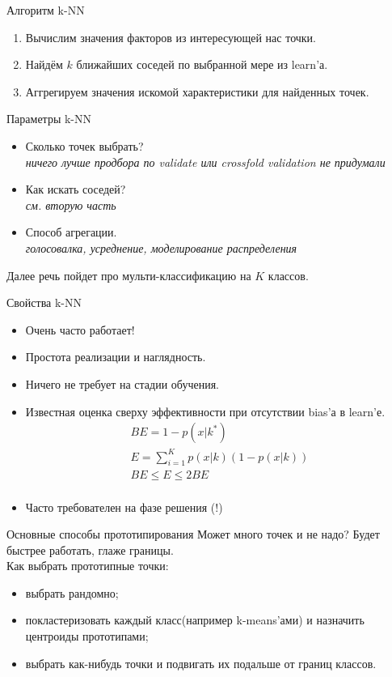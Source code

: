 \documentclass[14pt, fleqn, xcolor={dvipsnames, table}]{beamer}
\begin{document}
\begin{frame}{Алгоритм k-NN}
  \begin{enumerate}
    \item Вычислим значения факторов из интересующей нас точки.
    \item Найдём $k$ ближайших соседей по выбранной мере из learn'а.
    \item Аггрегируем значения искомой характеристики для найденных точек.
  \end{enumerate}
\end{frame}

\begin{frame}{Параметры k-NN}
  \begin{itemize}
    \item Сколько точек выбрать? \\
    \emph{ничего лучше продбора по validate или crossfold validation не придумали}
    \item Как искать соседей? \\
    \emph{см. вторую часть}
    \item Способ агрегации. \\
    \emph{голосовалка, усреднение, моделирование распределения}
  \end{itemize}
  Далее речь пойдет про мульти-классификацию на $K$ классов.
\end{frame}


\begin{frame}{Свойства k-NN}
  \begin{itemize}
    \item Очень часто работает! 
    \item Простота реализации и наглядность.
    \item Ничего не требует на стадии обучения.
    \item Известная оценка сверху эффективности при отсутствии bias'а в learn'е. \\
    $$
      \begin{array}{l}
      BE = 1 - p(x|k^*) \\
      E = \sum_{i=1}^Kp(x|k)(1-p(x|k)) \\
      BE \le E \le 2BE \\
      \end{array}
    $$
    \item Часто требователен на фазе решения (!)
  \end{itemize}
\end{frame}


\begin{frame}{Основные способы прототипирования}
  Может много точек и не надо? Будет быстрее работать, глаже границы. \\
  Как выбрать прототипные точки:
  \begin{itemize}
    \item выбрать рандомно;
    \item покластеризовать каждый класс(например k-means'ами) и назначить центроиды прототипами;
    \item выбрать как-нибудь точки и подвигать их подальше от границ классов.
  \end{itemize}
\end{frame}
\end{document}

